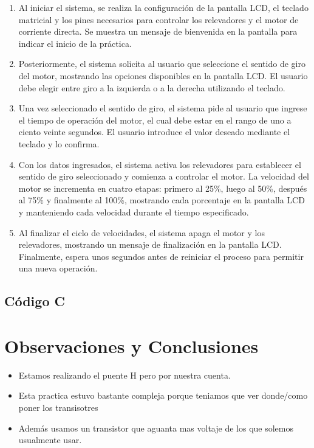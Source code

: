 \documentclass[11pt]{scrartcl}
\begin{document}
\begin{enumerate}
    \item Al iniciar el sistema, se realiza la configuración de la pantalla LCD, el teclado matricial y los pines necesarios para controlar los relevadores y el motor de corriente directa. Se muestra un mensaje de bienvenida en la pantalla para indicar el inicio de la práctica.
    \item Posteriormente, el sistema solicita al usuario que seleccione el sentido de giro del motor, mostrando las opciones disponibles en la pantalla LCD. El usuario debe elegir entre giro a la izquierda o a la derecha utilizando el teclado.
    \item Una vez seleccionado el sentido de giro, el sistema pide al usuario que ingrese el tiempo de operación del motor, el cual debe estar en el rango de uno a ciento veinte segundos. El usuario introduce el valor deseado mediante el teclado y lo confirma.
    \item Con los datos ingresados, el sistema activa los relevadores para establecer el sentido de giro seleccionado y comienza a controlar el motor. La velocidad del motor se incrementa en cuatro etapas: primero al 25\%, luego al 50\%, después al 75\% y finalmente al 100\%, mostrando cada porcentaje en la pantalla LCD y manteniendo cada velocidad durante el tiempo especificado.
    \item Al finalizar el ciclo de velocidades, el sistema apaga el motor y los relevadores, mostrando un mensaje de finalización en la pantalla LCD. Finalmente, espera unos segundos antes de reiniciar el proceso para permitir una nueva operación.
\end{enumerate}

\subsection{ Código C}




\section{Observaciones y Conclusiones}

\begin{itemize}
    \item Estamos realizando el puente H pero por nuestra cuenta.
    \item Esta practica estuvo bastante compleja porque teniamos que ver donde/como poner los transisotres 
    \item Además usamos un transistor que aguanta mas voltaje de los que solemos usualmente usar. 
\end{itemize}
  

    
\end{document}
